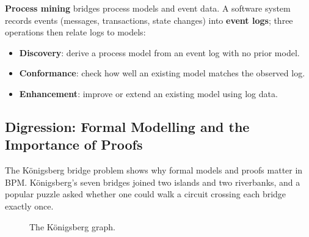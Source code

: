 \textbf{Process mining} bridges process models and event data. A software system records events (messages, transactions, state changes) into \textbf{event logs}; three operations then relate logs to models:

\begin{itemize}
  \item \textbf{Discovery}: derive a process model from an event log with no prior model.
  \item \textbf{Conformance}: check how well an existing model matches the observed log.
  \item \textbf{Enhancement}: improve or extend an existing model using log data.
\end{itemize}

\subsection{Digression: Formal Modelling and the Importance of Proofs}

The Königsberg bridge problem shows why formal models and proofs matter in BPM. Königsberg's seven bridges joined two islands and two riverbanks, and a popular puzzle asked whether one could walk a circuit crossing each bridge exactly once.

\begin{figure}
  \centering
  \vspace{-0.4cm}
  \caption{The Königsberg graph.}
  \label{fig:euler-graph}
  \vspace{-0.4cm}
\end{figure}

